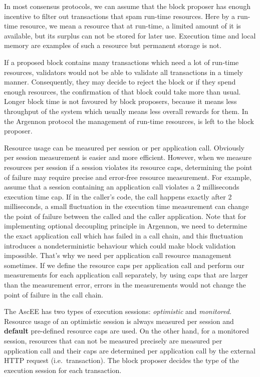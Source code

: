 In most consensus protocols, we can assume that the block proposer has enough incentive to filter out transactions
that spam run-time resources. Here by a run-time resource, we mean a resource that at run-time, a limited amount
of it is available, but its surplus can not be stored for later use. Execution time and local memory are
examples of such a resource but permanent storage is not.

If a proposed block contains many transactions which need a lot of run-time resources, validators would not
be able to validate all transactions in a timely manner. Consequently, they may decide to reject the block or if they
spend enough resources, the confirmation of that block could take more than usual. Longer block time is not
favoured by block proposers, because it means less throughput of the system which usually means less overall rewards
for them. In the Argennon protocol the management of run-time resources, is left to the block proposer.

Resource usage can be measured per session or per application call. Obviously per session measurement is
easier and more efficient. However, when we measure resources per session if
a session violates its resource caps, determining the point of failure may require precise and error-free resource
measurement. For example, assume that a session containing an application call
violates a 2 milliseconds execution time cap. If in the caller's code, the call happens exactly after 2 milliseconds,
a small fluctuation in the execution time measurement can
change the point of failure between the called and the caller application. Note that for implementing optional
decoupling principle in Argennon, we need to determine the
exact application call which has failed in a call chain, and this fluctuation introduces a nondeterministic
behaviour which could make block validation impossible. That's why we need per application call
resource management sometimes. If we define the resource caps per application call and
perform our measurements for each application call separately, by using caps that are larger than the measurement
error, errors in the measurements would not change the point of failure in the call chain.

The AscEE has two types of execution sessions: \emph{optimistic} and \emph{monitored}. Resource usage of an optimistic
session is always measured per session and \textbf{default} pre-defined resource caps are used. On the other hand, for a
monitored session, resources that can not be measured precisely are measured per application call and their caps are
determined per application call by the external HTTP request (i.e.\ transaction). The block proposer decides the
type of the execution session for each transaction.


